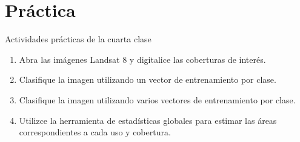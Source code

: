 \documentclass[handout]{beamer}
\begin{document}
\section{Pr\'actica}

\begin{frame}{\secname}
  \begin{exampleblock}{Actividades pr\'acticas de la cuarta clase}
    \begin{enumerate}[<+>]
      \item Abra las im\'agenes Landsat 8 y digitalice las coberturas de inter\'es.
      \item Clasifique la imagen utilizando un vector de entrenamiento por clase.
      \item Clasifique la imagen utilizando varios vectores de entrenamiento por clase.
      \item Utilizce la herramienta de estad\'isticas globales para estimar las \'areas correspondientes a cada uso y cobertura.
    \end{enumerate}
  \end{exampleblock}
\end{frame}
\end{document}

